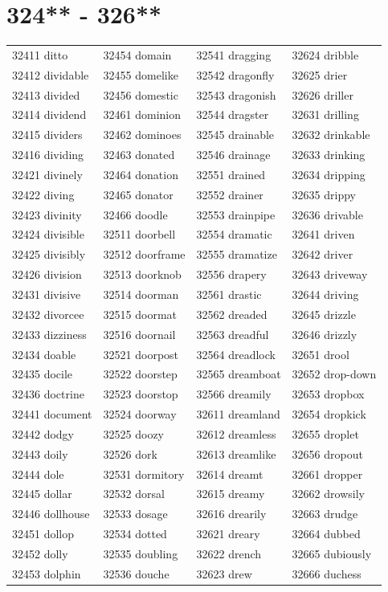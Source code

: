 \documentclass[10pt, oneside]{book}
\begin{document}
\begin{table}
	\centering
	\section*{324** - 326**}
	\begin{tabular}{l l l l}
32411 ditto &32454 domain &32541 dragging &32624 dribble\\
32412 dividable &32455 domelike &32542 dragonfly &32625 drier\\
32413 divided &32456 domestic &32543 dragonish &32626 driller\\
32414 dividend &32461 dominion &32544 dragster &32631 drilling\\
32415 dividers &32462 dominoes &32545 drainable &32632 drinkable\\
32416 dividing &32463 donated &32546 drainage &32633 drinking\\
32421 divinely &32464 donation &32551 drained &32634 dripping\\
32422 diving &32465 donator &32552 drainer &32635 drippy\\
32423 divinity &32466 doodle &32553 drainpipe &32636 drivable\\
32424 divisible &32511 doorbell &32554 dramatic &32641 driven\\
32425 divisibly &32512 doorframe &32555 dramatize &32642 driver\\
32426 division &32513 doorknob &32556 drapery &32643 driveway\\
32431 divisive &32514 doorman &32561 drastic &32644 driving\\
32432 divorcee &32515 doormat &32562 dreaded &32645 drizzle\\
32433 dizziness &32516 doornail &32563 dreadful &32646 drizzly\\
32434 doable &32521 doorpost &32564 dreadlock &32651 drool\\
32435 docile &32522 doorstep &32565 dreamboat &32652 drop-down\\
32436 doctrine &32523 doorstop &32566 dreamily &32653 dropbox\\
32441 document &32524 doorway &32611 dreamland &32654 dropkick\\
32442 dodgy &32525 doozy &32612 dreamless &32655 droplet\\
32443 doily &32526 dork &32613 dreamlike &32656 dropout\\
32444 dole &32531 dormitory &32614 dreamt &32661 dropper\\
32445 dollar &32532 dorsal &32615 dreamy &32662 drowsily\\
32446 dollhouse &32533 dosage &32616 drearily &32663 drudge\\
32451 dollop &32534 dotted &32621 dreary &32664 dubbed\\
32452 dolly &32535 doubling &32622 drench &32665 dubiously\\
32453 dolphin &32536 douche &32623 drew &32666 duchess\\
	\end{tabular}
 \end{table}
\clearpage
\end{document}
